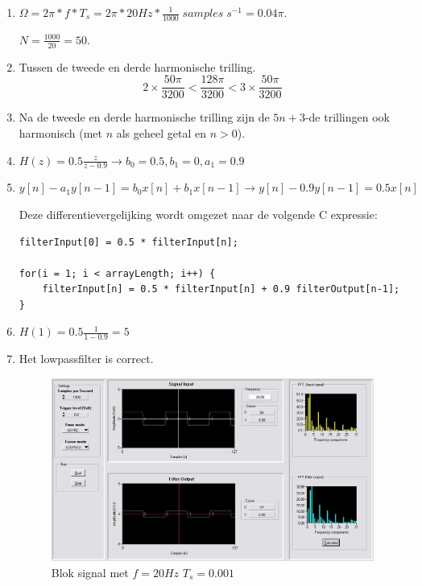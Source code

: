 \documentclass[10pt,a4paper]{article}
\begin{document}
\begin{enumerate}
    \item $ \Omega = 2\pi * f * T_s = 2\pi * 20 Hz * \frac{1}{1000} \; samples
        \; s^{-1} = 0.04 \pi $.

    \noindent $ N = \frac{1000}{20} = 50 $.

    \item Tussen de tweede en derde harmonische trilling.
    \[ 2 \times \frac{50 \pi}{3200} < \frac{128 \pi}{3200} < 3 \times
    \frac{50 \pi}{3200} \]

    \item Na de tweede en derde harmonische trilling zijn de $5n+3$-de
    trillingen ook harmonisch (met $n$ als geheel getal en $n > 0$).

    \item $H(z) = 0.5 \frac{z}{z-0.9} \rightarrow b_0 = 0.5, b_1 = 0, a_1 = 0.9$

    \item $y[n] - a_1y[n-1] = b_0x[n] + b_1x[n-1]
        \rightarrow y[n] - 0.9y[n-1] = 0.5x[n]$

    Deze differentievergelijking wordt omgezet naar de volgende C expressie:

    \begin{verbatim}
filterInput[0] = 0.5 * filterInput[n];

for(i = 1; i < arrayLength; i++) {
    filterInput[n] = 0.5 * filterInput[n] + 0.9 filterOutput[n-1];
}
    \end{verbatim}

    \item $H(1) = 0.5 \frac{1}{1 - 0.9} = 5 $

    \item Het lowpassfilter is correct.

    \begin{figure}[H]
    \includegraphics[scale=0.5]{blok_1000_20.JPG}
    \caption{Blok signal met $f=20Hz$ $T_{s}=0.001$}
    \end{figure}
 

\end{enumerate}
\end{document}
